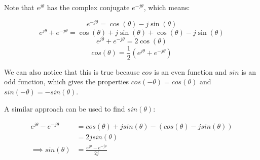 \begin{enumerate}[resume]
{  Note that $e^{j\theta}$ has the complex conjugate $e^{-j\theta}$, which means:

  $$e^{-j\theta} = \cos(\theta) - j\sin(\theta)$$
  $$e^{j\theta} +  e^{-j\theta} = \cos(\theta) + j\sin(\theta) + \cos(\theta) - j\sin(\theta)$$
  $$e^{j\theta} +  e^{-j\theta} = 2\cos(\theta)$$
  $$cos(\theta) = \frac{1}{2}(e^{j\theta} +  e^{-j\theta})$$

  We can also notice that this is true because $cos$ is an even function and $sin$ is an odd function, which gives the properties
  $cos(-\theta) = cos(\theta)$ and $sin(-\theta) = -sin(\theta)$.

  A similar approach can be used to find $sin(\theta)$:

  \begin{align*}
    e^{j\theta} - e^{-j\theta} &= cos(\theta) + jsin(\theta) - (cos(\theta) - jsin(\theta)) \\
    &= 2jsin(\theta) \\
    \implies sin(\theta) &= \frac{e^{j\theta} - e^{-j\theta}}{2j}
  \end{align*}

}

\end{enumerate}
